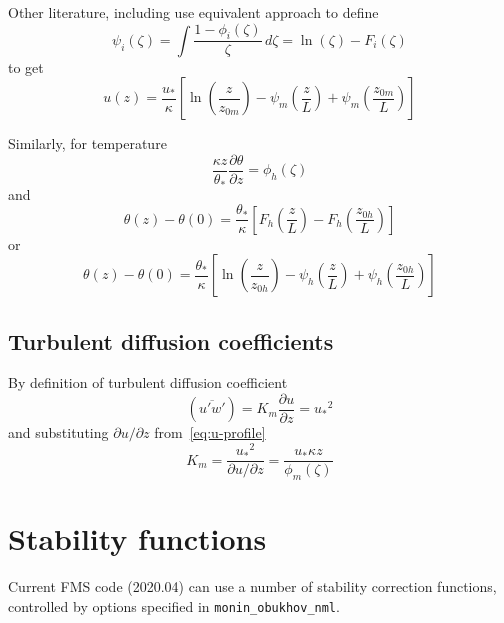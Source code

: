 \documentclass{article}
\newcommand{\pderiv}[2]{\frac{\partial #1}{\partial #2}} %
\newcommand{\vonkarman}{\kappa} %
\newcommand{\pt}{\theta} %
\newcommand{\ustar}{\ensuremath{u_*}} %
\newcommand{\tstar}{\ensuremath{\pt_*}} %
\newcommand{\zm}{z_{0m}} %
\newcommand{\zh}{z_{0h}} %
\newcommand{\fstab}{\phi} %
\begin{document}
Other literature, including \cite{Jimenez2012} use equivalent approach to define
\begin{equation}
   \psi_i(\zeta) = \int\frac{1-\fstab_i(\zeta)}{\zeta}\, d \zeta
               = \ln(\zeta) - F_i(\zeta)
\end{equation}
to get
\begin{equation}
   u(z) = \frac{\ustar}{\vonkarman}\left[
          \ln\left(\frac{z}{\zm}\right) - \psi_m\left(\frac{z}{L}\right) + \psi_m\left(\frac{\zm}{L}\right)
      \right]
\end{equation}

Similarly, for temperature
\begin{equation}\label{eq:b-profile}
   \frac{\vonkarman z}{\tstar}\pderiv{\pt}{z} = \fstab_h(\zeta)
\end{equation}
and
\begin{equation}
   \pt(z) - \pt(0) = \frac{\tstar}{\vonkarman} \left[
          F_h\left(\frac{z}{L}\right)-F_h\left(\frac{\zh}{L}\right)
      \right]
\end{equation}
or
\begin{equation}
   \pt(z) - \pt(0) = \frac{\tstar}{\vonkarman}\left[
          \ln\left(\frac{z}{\zh}\right) - \psi_h\left(\frac{z}{L}\right) + \psi_h\left(\frac{\zh}{L}\right)
      \right]
\end{equation}

\subsection{Turbulent diffusion coefficients}
By definition of turbulent diffusion coefficient
\begin{equation}
   (\overline{u'w'}) = K_m \pderiv{u}{z} = \ustar^2
\end{equation}
and substituting ${\partial u/\partial z}$ from~\eqref{eq:u-profile}
\begin{equation}
   K_m = \frac{\ustar^2}{\partial u/\partial z} = \frac{\ustar \vonkarman z}{\fstab_m(\zeta)}
\end{equation}
\section{Stability functions}
Current FMS code (2020.04) can use a number of stability correction functions, controlled by options specified in \verb|monin_obukhov_nml|.
\end{document}
